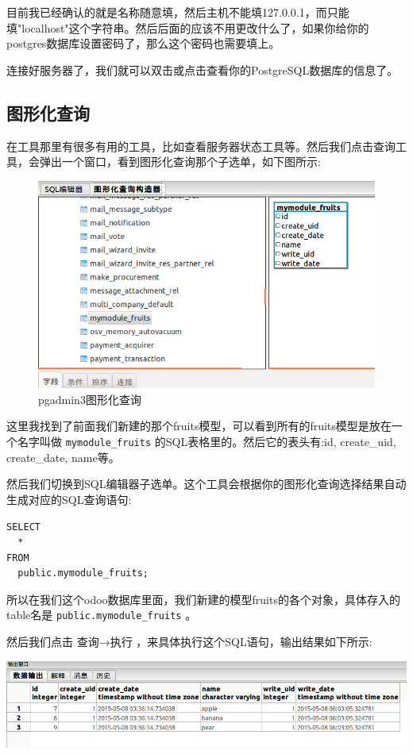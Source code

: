 \documentclass[11pt,a4paper]{sphinxmanual}
\begin{document}
目前我已经确认的就是名称随意填，然后主机不能填127.0.0.1，而只能填"localhost"这个字符串。然后后面的应该不用更改什么了，如果你给你的postgres数据库设置密码了，那么这个密码也需要填上。

连接好服务器了，我们就可以双击或点击查看你的PostgreSQL数据库的信息了。

\subsection{图形化查询}
\label{sec-5-4-3}
在工具那里有很多有用的工具，比如查看服务器状态工具等。然后我们点击查询工具，会弹出一个窗口，看到图形化查询那个子选单，如下图所示:

\begin{figure}[H]
\centering
\includegraphics[keepaspectratio,max width=0.95\linewidth]{images/pgadmin3图形化查询.png}
\caption{pgadmin3图形化查询}
\end{figure}

这里我找到了前面我们新建的那个fruits模型，可以看到所有的fruits模型是放在一个名字叫做 \verb~mymodule_fruits~ 的SQL表格里的。然后它的表头有:id, create\_uid, create\_date, name等。

然后我们切换到SQL编辑器子选单。这个工具会根据你的图形化查询选择结果自动生成对应的SQL查询语句:
\begin{Verbatim}
SELECT 
  * 
FROM 
  public.mymodule_fruits;
\end{Verbatim}

所以在我们这个odoo数据库里面，我们新建的模型fruits的各个对象，具体存入的table名是 \verb~public.mymodule_fruits~ 。

然后我们点击 查询→执行 ，来具体执行这个SQL语句，输出结果如下所示:

\includegraphics[keepaspectratio,max width=0.95\linewidth]{images/pgadmin3具体查询结果.png}
\end{document}
